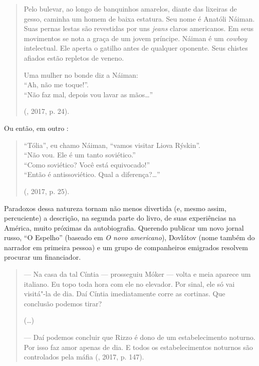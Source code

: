 \begin{quotation}
Pelo bulevar, ao longo de banquinhos amarelos, diante das lixeiras de
gesso, caminha um homem de baixa estatura. Seu nome é Anatóli Náiman.
Suas pernas lestas são revestidas por uns \emph{jeans} claros americanos. Em seus
movimentos se nota a graça de um jovem príncipe. Náiman é um \emph{cowboy}
intelectual. Ele aperta o gatilho antes de qualquer oponente. Seus 
chistes afiados estão repletos de veneno.\\



\noindent{}Uma mulher no bonde diz a Náiman: \\
``Ah, não me toque!''. \\
``Não faz mal, depois vou lavar as mãos\ldots{}''

(, 2017, p. 24).

\end{quotation}

Ou então, em outro :

\begin{quotation}
\noindent{}``Tólia'', eu chamo Náiman, ``vamos visitar Liova Rýskin''. \\
``Não vou. Ele é um  tanto soviético.'' \\
``Como soviético? Você está equivocado!'' \\
``Então é antissoviético. Qual a diferença?\ldots{}''

(, 2017, p. 25).

\end{quotation}

Paradoxos dessa natureza tornam não menos divertida (e, mesmo assim,
 percuciente) a descrição, na segunda parte do livro, de suas 
experiências na América, muito próximas da autobiografia. Querendo
publicar um novo jornal russo, ``O Espelho'' (baseado em \emph{O novo
 americano}), Dovlátov (nome também do narrador em primeira pessoa) e um grupo de
companheiros emigrados resolvem procurar um financiador.

\begin{quotation}
--- Na casa da tal Cíntia --- prosseguiu Móker --- volta e meia aparece um italiano. Eu topo toda hora com ele no elevador. Por sinal, ele só vai visitá"-la de dia. Daí Cíntia imediatamente corre as cortinas. Que conclusão podemos tirar?

(\ldots{})

--- Daí podemos concluir que Rizzo é dono de um estabelecimento noturno. Por isso faz amor apenas de dia. E todos os estabelecimentos noturnos são controlados pela máfia (, 2017, p. 147).
\end{quotation}

